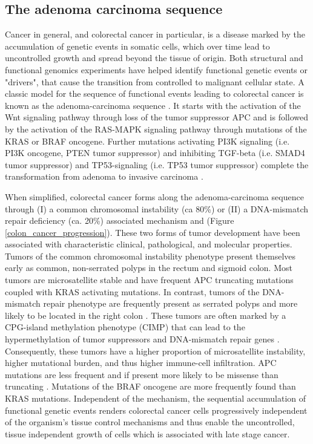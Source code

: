 \begin{flushleft}
\subsection{The adenoma carcinoma sequence}
Cancer in general, and colorectal cancer in particular, is a disease marked by the accumulation of genetic events in somatic cells, which over time lead to uncontrolled growth and spread beyond the tissue of origin. Both structural and functional genomics experiments have helped identify functional genetic events or "drivers", that cause the transition from controlled to malignant cellular state. A classic model for the sequence of functional events leading to colorectal cancer is known as the adenoma-carcinoma sequence \cite{vogelsteinGeneticAlterationsColorectaltumor1988}. It starts with the activation of the Wnt signaling pathway through loss of the tumor suppressor APC and is followed by the activation of the RAS-MAPK signaling pathway through mutations of the KRAS or BRAF oncogene. Further mutations activating PI3K signaling (i.e. PI3K oncogene, PTEN tumor suppressor) and inhibiting TGF-beta (i.e. SMAD4 tumor suppressor) and TP53-signaling (i.e. TP53 tumor suppressor) complete the transformation from adenoma to invasive carcinoma \cite{fearonMolecularGeneticsColorectal2011}. \par

When simplified, colorectal cancer forms along the adenoma-carcinoma sequence through (I) a common chromosomal instability (ca 80\%) or (II) a DNA-mismatch repair deficiency (ca. 20\%) associated mechanism \cite{Markowitz2009} and \cite{pancioneGeneticEpigeneticEvents2012} (Figure \ref{colon_cancer_progression}). These two forms of tumor development have been associated with characteristic clinical, pathological, and molecular properties. Tumors of the common chromosomal instability phenotype present themselves early as common, non-serrated polyps in the rectum and sigmoid colon. Most tumors are microsatellite stable and have frequent APC truncating mutations coupled with KRAS activating mutations. In contrast, tumors of the DNA-mismatch repair phenotype are frequently present as serrated polyps and more likely to be located in the right colon \cite{Markowitz2009}. These tumors are often marked by a CPG-island methylation phenotype (CIMP) that can lead to the hypermethylation of tumor suppressors and DNA-mismatch repair genes \cite{oginoCpGIslandMethylator2009}. Consequently, these tumors have a higher proportion of microsatellite instability, higher mutational burden, and thus higher immune-cell infiltration. APC mutations are less frequent and if present more likely to be missense than truncating \cite{borowskyRoleAPCWNT2018}. Mutations of the BRAF oncogene are more frequently found than KRAS mutations. Independent of the mechanism, the sequential accumulation of functional genetic events renders colorectal cancer cells progressively independent of the organism's tissue control mechanisms and thus enable the uncontrolled, tissue independent growth of cells which is associated with late stage cancer.


\end{flushleft}
